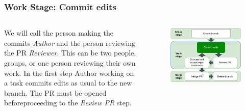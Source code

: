 \documentclass[aspectratio=169]{beamer}
\begin{document}
\begin{frame}
	\frametitle{Work Stage: Commit edits}
	\begin{columns}[c]
		
		
		\normalsize
  		We will call the person making the commits \textit{Author} 
		and the person reviewing the PR \textit{Reviewer}. 
		This can be two people, groups, or one person reviewing their own work.
  \vspace{.5cm}\newline
		In the first step Author working on a task
		commits edits as usual to the new branch.
  \vspace{.5cm}\newline
		The PR must be opened beforeproceeding to the \textit{Review PR} step.
		
		\vspace{-.75cm}
		\begin{figure}
			\centering
			\includegraphics[width=\textwidth]{./img/branch-pr-merge-cycle-S2a.png}
		\end{figure}
		
	\end{columns}
\end{frame}
\end{document}
